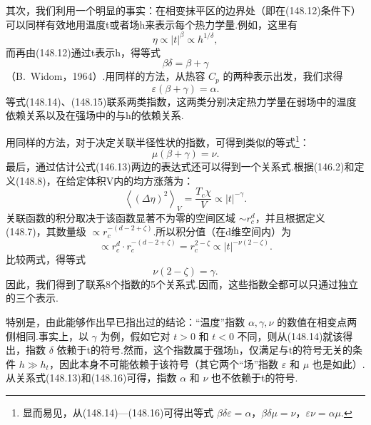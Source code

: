 其次，我们利用一个明显的事实：在相变抹平区的边界处（即在(148.12)条件下）可以同样有效地用温度t或者场h来表示每个热力学量.例如，这里有
\begin{equation*}
  \eta\propto|t|^{\beta}\propto h^{1/\delta},
\end{equation*}
而再由(148.12)通过t表示h，得等式
\begin{equation}
  \beta\delta=\beta+\gamma
\end{equation}
（B.~Widom，1964）.用同样的方法，从热容 $C_p$ 的两种表示出发，我们求得
\begin{equation}
  \varepsilon(\beta+\gamma)=\alpha.
\end{equation}
等式(148.14)、(148.15)联系两类指数，这两类分别决定热力学量在弱场中的温度依赖关系以及在强场中的与h的依赖关系.

用同样的方法，对于决定关联半径性状的指数，可得到类似的等式\footnote{显而易见，从(148.14)—(148.16)可得出等式 $\beta\delta\varepsilon=\alpha$，$\beta\delta\mu=\nu$，$\varepsilon\nu=\alpha\mu$.}：
\begin{equation}
  \mu(\beta+\gamma)=\nu.
\end{equation}
最后，通过估计公式(146.13)两边的表达式还可以得到一个关系式.根据(146.2)和定义(148.8)，在给定体积V内的均方涨落为：
\begin{equation*}
  \left\langle(\Delta\eta)^2\right\rangle_V
  =\frac{T_c\chi}{V}\propto|t|^{-\gamma}.
\end{equation*}
关联函数的积分取决于该函数显著不为零的空间区域 $\sim r_c^d$，并且根据定义(148.7)，其数量级 $\propto r_c^{-(d-2+\zeta)}$.所以积分值（在d维空间内）为
\begin{equation*}
  \propto r_c^d\cdot r_c^{-(d-2+\zeta)}=r_c^{2-\zeta}
  \propto|t|^{-\nu(2-\zeta)}.
\end{equation*}
比较两式，得等式
\begin{equation}
  \nu(2-\zeta)=\gamma.
\end{equation}
因此，我们得到了联系8个指数的5个关系式.因而，这些指数全都可以只通过独立的三个表示.

特别是，由此能够作出早已指出过的结论：“温度”指数 $\alpha,\gamma,\nu$ 的数值在相变点两侧相同.事实上，以 $\gamma$ 为例，假如它对 $t>0$ 和 $t<0$ 不同，则从(148.14)就该得出，指数 $\delta$ 依赖于t的符号.然而，这个指数属于强场h，仅满足与t的符号无关的条件 $h\gg h_t$，因此本身不可能依赖于该符号（其它两个“场”指数 $\varepsilon$ 和 $\mu$ 也是如此）.从关系式(148.13)和(148.16)可得，指数 $\alpha$ 和 $\nu$ 也不依赖于t的符号.

